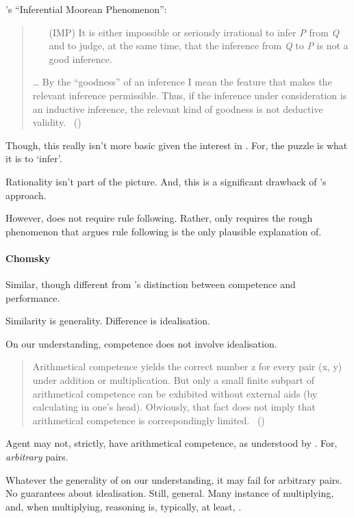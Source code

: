 \begin{note}
  \citeauthor{Hlobil:2014tq}'s ``Inferential Moorean Phenomenon'':
  \begin{quote}
    \begin{enumerate}
    \item[(IMP)]
      It is either impossible or seriously irrational to infer \emph{P} from \emph{Q} and to judge, at the same time, that the inference from \emph{Q} to \emph{P} is not a good inference.
    \end{enumerate}
    \dots
    By the ``goodness'' of an inference I mean the feature that makes the relevant inference permissible. Thus, if the inference under consideration is an inductive inference, the relevant kind of goodness is not deductive validity.%
    \mbox{ }\hfill\mbox{(\citeyear[\S1]{Hlobil:2014tq})}
  \end{quote}

  Though, this really isn't more basic given the interest in \sR{}.
  For, the puzzle is what it is to `infer'.

  Rationality isn't part of the picture.
  And, this is a significant drawback of \citeauthor{Hlobil:2014tq}'s approach.
\end{note}


\begin{note}
  However, \sR{} does not require rule following.
  Rather, \sR{} only requires the rough phenomenon that \citeauthor{Boghossian:2008vf} argues rule following is the only plausible explanation of.
\end{note}

\paragraph{Chomsky}

\begin{note}
  Similar, though different from \citeauthor{Chomsky:2015aa}'s distinction between competence and performance.

  Similarity is generality.
  Difference is idealisation.

  On our understanding, competence does not involve idealisation.

  \begin{quote}
    Arithmetical competence yields the correct number z for every pair (x, y) under addition or multiplication.
    But only a small finite subpart of arithmetical competence can be exhibited without external aids (by calculating in one's head).
    Obviously, that fact does not imply that arithmetical competence is correspondingly limited.\newline
    \mbox{ }\hfill\mbox{(\citeyear[xii]{Chomsky:2015aa})}
  \end{quote}

  Agent may not, strictly, have arithmetical competence, as understood by \citeauthor{Chomsky:2015aa}.
  For, \emph{arbitrary} pairs.

  Whatever the generality of  on our understanding, it may fail for arbitrary pairs.
  No guarantees about idealisation.
  Still, general.
  Many instance of multiplying, and, when multiplying, reasoning is, typically, at least, \sR{}.
\end{note}

